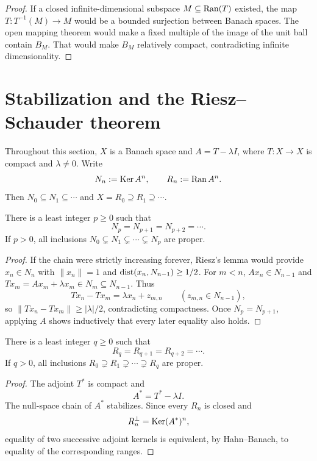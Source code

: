 \begin{proof}
If a closed infinite-dimensional subspace $M\subseteq\operatorname{Ran}(T)$ existed, the
map $T\colon T^{-1}(M)\to M$ would be a bounded surjection between Banach
spaces.  The open mapping theorem would make a fixed multiple of the image of
the unit ball contain $B_M$.  That would make $B_M$ relatively compact,
contradicting infinite dimensionality.
\end{proof}

\section{Stabilization and the Riesz--Schauder theorem}

Throughout this section, $X$ is a Banach space and
$A=T-\lambda I$, where $T\colon X\to X$ is compact and $\lambda\ne0$.
Write
\[
  N_n:=\operatorname{Ker} A^n,
  \qquad
  R_n:=\operatorname{Ran} A^n.
\]
Then $N_0\subseteq N_1\subseteq\cdots$ and
$X=R_0\supseteq R_1\supseteq\cdots$.

\begin{notelemma}
There is a least integer $p\ge0$ such that
\[
  N_p=N_{p+1}=N_{p+2}=\cdots.
\]
If $p>0$, all inclusions $N_0\subsetneq N_1\subsetneq\cdots\subsetneq N_p$
are proper.
\end{notelemma}

\begin{proof}
If the chain were strictly increasing forever, Riesz's lemma would provide
$x_n\in N_n$ with $\|x_n\|=1$ and
$\operatorname{dist}(x_n,N_{n-1})\ge1/2$.  For $m<n$,
$Ax_n\in N_{n-1}$ and $Tx_m=Ax_m+\lambda x_m\in N_m\subseteq N_{n-1}$.
Thus
\[
  Tx_n-Tx_m=\lambda x_n+z_{m,n}
  \qquad(z_{m,n}\in N_{n-1}),
\]
so $\|Tx_n-Tx_m\|\ge|\lambda|/2$, contradicting compactness.  Once
$N_p=N_{p+1}$, applying $A$ shows inductively that every later equality also
holds.
\end{proof}

\begin{notelemma}
There is a least integer $q\ge0$ such that
\[
  R_q=R_{q+1}=R_{q+2}=\cdots.
\]
If $q>0$, all inclusions $R_0\supsetneq R_1\supsetneq\cdots\supsetneq R_q$
are proper.
\end{notelemma}

\begin{proof}
The adjoint $T^*$ is compact and
\[
  A^*=T^*-\lambda I.
\]
The null-space chain of $A^*$ stabilizes.  Since every $R_n$ is closed and
\[
  R_n^\perp=\operatorname{Ker}(A^*)^n,
\]
equality of two successive adjoint kernels is equivalent, by Hahn--Banach,
to equality of the corresponding ranges.
\end{proof}

